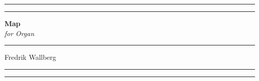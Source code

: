 \documentclass{article}
\begin{document}
\begin{titlepage}
  \begin{center}
    \vspace*{\fill}

    \rule{\textwidth}{1pt}\par        %
    \vspace{2pt}\vspace{-\baselineskip} %
    \rule{\textwidth}{0.4pt}\par        %

    \vspace{0.75cm}
    {\Huge \textbf {Map}}\\[0.4cm]

    {\Large \emph {for Organ}}\\[0.4cm]

    \rule{0.3\textwidth}{0.4pt}\par

    \vspace{0.5cm}
    {\Large Fredrik Wallberg}\\[0.4cm]
    \vspace{0.25cm}

    \rule{\textwidth}{0.4pt}\par      %
    \vspace{2pt}\vspace{-\baselineskip} %
    \rule{\textwidth}{1pt}\par          %
    \vspace*{\fill}
  \end{center}

\end{titlepage}
\end{document}
